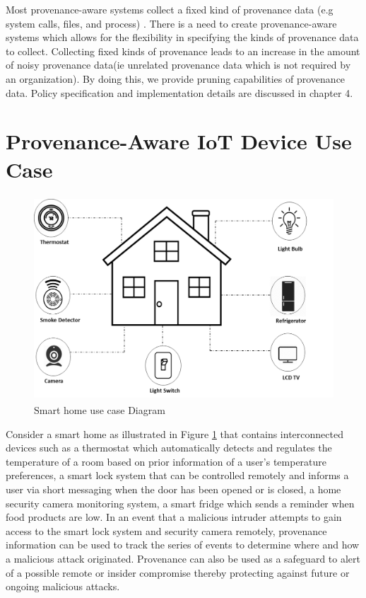 Most provenance-aware systems collect a fixed kind of provenance data (e.g system calls, files, and process)  \cite{King:2003:BI:945445.945467, altintas,glavic_case_2011}. There is a need to create provenance-aware systems which allows for the flexibility in specifying the kinds of provenance data to collect. Collecting fixed kinds of provenance leads to  an increase in the amount of noisy provenance data(ie unrelated provenance data which is not required by an organization). By doing this, we provide pruning capabilities \cite{braun2006issues} of provenance data. Policy specification and implementation details are discussed in chapter 4.  










\section{Provenance-Aware IoT Device Use Case}

\begin{figure}[tb]
\begin{center}
\includegraphics[height=3in]{smart_home_use_case.png}
\end{center}
\caption{Smart home use case Diagram}
\label{smart_home}
\end{figure}



Consider a smart home as illustrated in Figure \ref{smart_home} that contains interconnected devices such as a thermostat which automatically detects and regulates the temperature of a room based on prior information of a user's temperature preferences, a smart lock system that can be controlled remotely and informs a user via short messaging when the door has been opened or is closed, a home security camera monitoring system, a smart fridge which sends a reminder when food products are low. In an event that a malicious intruder attempts  to gain access to the smart lock system and security camera remotely, provenance information can be used to track the series  of events to determine where and how a malicious attack originated. Provenance can also be used as a safeguard to alert of a possible remote or insider compromise thereby protecting against future or ongoing malicious attacks. 





